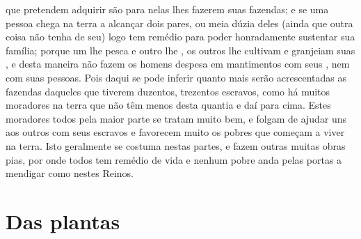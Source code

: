 que pretendem adquirir são  para nelas lhes fazerem suas \EP[-2]
fazendas; e se uma pessoa chega na terra a alcançar dois pares, ou meia
dúzia deles (ainda que outra coisa não tenha de seu) logo tem remédio
para poder honradamente sustentar sua família; porque um lhe pesca e				%
outro lhe , os outros lhe cultivam e granjeiam suas , e desta	%
maneira não fazem os homens despesa em mantimentos com seus ,
nem com suas pessoas. Pois daqui se pode inferir quanto mais serão
acrescentadas as fazendas daqueles que tiverem duzentos, trezentos
escravos, como há muitos moradores na terra que não têm menos desta
quantia e daí para cima. Estes moradores todos pela maior parte se
tratam muito bem, e folgam de ajudar uns aos outros com seus escravos e 
favorecem muito os pobres que começam a viver na terra. Isto geralmente				%
se costuma nestas partes, e fazem outras muitas obras pias, por onde
todos tem remédio de vida e nenhum pobre anda pelas portas a mendigar
como nestes Reinos.

\chapter[Das plantas, mantimentos e frutas]{Das
plantas}

